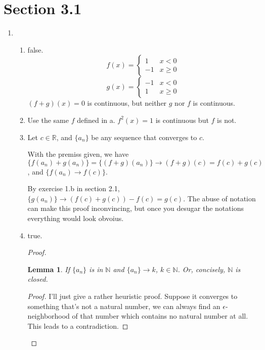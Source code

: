 \documentclass{article}
\newtheorem{lemma}{Lemma}
\begin{document}
\section*{Section 3.1}
\begin{enumerate}
\item
  \begin{enumerate}[label=\alph*.]
  \item false.
    \begin{equation*}
      f(x) =
      \begin{cases}
        1 & x < 0 \\
        -1 & x \geq 0
      \end{cases}
    \end{equation*}
    \begin{equation*}
      g(x) =
      \begin{cases}
        -1 & x < 0 \\
        1 & x \geq 0
      \end{cases}
    \end{equation*}
    $(f+g)(x) = 0$ is continuous, but neither $g$ nor $f$ is
    continuous.
  \item Use the same $f$ defined in a. $f^2(x) = 1$ is continuous but
    $f$ is not.
  \item Let $c \in \mathbb{R}$, and $\{a_n\}$ be any sequence that
    converges to $c$.

    With the premiss given, we have $\{f(a_n) + g(a_n)\} = \{(f+g)
    (a_n)\} \rightarrow (f+g)(c) = f(c) + g(c)$, and $\{f(a_n)
    \rightarrow f(c)\}$.

    By exercise 1.b in section 2.1, $\{g(a_n)\} \rightarrow (f(c) +
    g(c)) - f(c) = g(c)$. The abuse of notation can make this proof
    inconvincing, but once you desugar the notations everything would
    look obvoius.
  \item true.
    \begin{proof}
      \begin{lemma}
        If $\{a_n\}$ is in $\mathbb{N}$ and $\{a_n\} \rightarrow k$,
        $k \in \mathbb{N}$. Or, concisely, $\mathbb{N}$ is closed.
      \end{lemma}
      \begin{proof}
        I'll just give a rather heuristic proof. Suppose it converges
        to something that's not a natural number, we can always find
        an $\epsilon$-neighborhood of that number which contains no
        natural number at all. This leads to a contradiction.
      \end{proof}


\end{proof}
\end{enumerate}
\end{enumerate}
\end{document}
